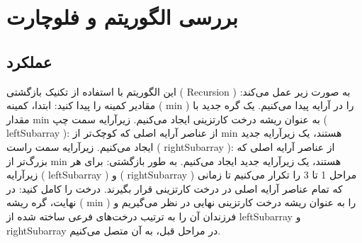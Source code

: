 \documentclass{article}
\begin{document}
\section{بررسی الگوریتم و فلوچارت}
\subsection{عملکرد}
\newline این الگوریتم با استفاده از تکنیک بازگشتی ( Recursion ) به صورت زیر عمل می‌کند:
\newline مقادیر کمینه را پیدا کنید: ابتدا، کمینه ( min ) را در آرایه پیدا می‌کنیم.
\newline یک گره جدید با مقدار min به عنوان ریشه درخت کارتزینی ایجاد می‌کنیم.
\newline زیرآرایه سمت چپ ( leftSubarray ): از عناصر آرایه اصلی که کوچک‌تر از min هستند، یک زیرآرایه جدید ایجاد می‌کنیم.
\newline زیرآرایه سمت راست ( rightSubarray ): از عناصر آرایه اصلی که بزرگ‌تر از min هستند، یک زیرآرایه جدید ایجاد می‌کنیم.
\newline به طور بازگشتی: برای هر زیرآرایه ( leftSubarray ) و ( rightSubarray ) مراحل 1 تا 3 را تکرار می‌کنیم تا زمانی که تمام عناصر آرایه اصلی در درخت کارتزینی قرار بگیرند.
\newline درخت را کامل کنید: در نهایت، گره ریشه ( min ) را به عنوان ریشه درخت کارتزینی نهایی در نظر می‌گیریم و فرزندان آن را به ترتیب درخت‌های فرعی ساخته شده از leftSubarray و rightSubarray در مراحل قبل، به آن متصل می‌کنیم.
\end{document}
